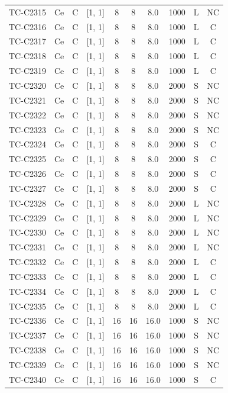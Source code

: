 \begin{longtable}{lccccccccc}
TC-C2315 & Ce & C & [1, 1] & 8 & 8 & 8.0 & 1000 & L & NC \\
TC-C2316 & Ce & C & [1, 1] & 8 & 8 & 8.0 & 1000 & L & C \\
TC-C2317 & Ce & C & [1, 1] & 8 & 8 & 8.0 & 1000 & L & C \\
TC-C2318 & Ce & C & [1, 1] & 8 & 8 & 8.0 & 1000 & L & C \\
TC-C2319 & Ce & C & [1, 1] & 8 & 8 & 8.0 & 1000 & L & C \\
TC-C2320 & Ce & C & [1, 1] & 8 & 8 & 8.0 & 2000 & S & NC \\
TC-C2321 & Ce & C & [1, 1] & 8 & 8 & 8.0 & 2000 & S & NC \\
TC-C2322 & Ce & C & [1, 1] & 8 & 8 & 8.0 & 2000 & S & NC \\
TC-C2323 & Ce & C & [1, 1] & 8 & 8 & 8.0 & 2000 & S & NC \\
TC-C2324 & Ce & C & [1, 1] & 8 & 8 & 8.0 & 2000 & S & C \\
TC-C2325 & Ce & C & [1, 1] & 8 & 8 & 8.0 & 2000 & S & C \\
TC-C2326 & Ce & C & [1, 1] & 8 & 8 & 8.0 & 2000 & S & C \\
TC-C2327 & Ce & C & [1, 1] & 8 & 8 & 8.0 & 2000 & S & C \\
TC-C2328 & Ce & C & [1, 1] & 8 & 8 & 8.0 & 2000 & L & NC \\
TC-C2329 & Ce & C & [1, 1] & 8 & 8 & 8.0 & 2000 & L & NC \\
TC-C2330 & Ce & C & [1, 1] & 8 & 8 & 8.0 & 2000 & L & NC \\
TC-C2331 & Ce & C & [1, 1] & 8 & 8 & 8.0 & 2000 & L & NC \\
TC-C2332 & Ce & C & [1, 1] & 8 & 8 & 8.0 & 2000 & L & C \\
TC-C2333 & Ce & C & [1, 1] & 8 & 8 & 8.0 & 2000 & L & C \\
TC-C2334 & Ce & C & [1, 1] & 8 & 8 & 8.0 & 2000 & L & C \\
TC-C2335 & Ce & C & [1, 1] & 8 & 8 & 8.0 & 2000 & L & C \\
TC-C2336 & Ce & C & [1, 1] & 16 & 16 & 16.0 & 1000 & S & NC \\
TC-C2337 & Ce & C & [1, 1] & 16 & 16 & 16.0 & 1000 & S & NC \\
TC-C2338 & Ce & C & [1, 1] & 16 & 16 & 16.0 & 1000 & S & NC \\
TC-C2339 & Ce & C & [1, 1] & 16 & 16 & 16.0 & 1000 & S & NC \\
TC-C2340 & Ce & C & [1, 1] & 16 & 16 & 16.0 & 1000 & S & C \\

\end{longtable}
